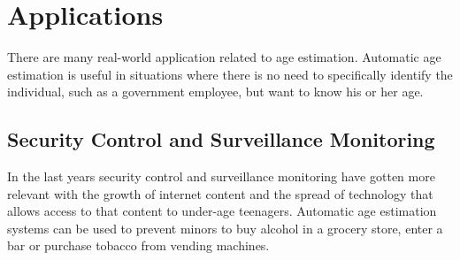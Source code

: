\begin{table}[h!]
	\centering
	\caption{Age Estimation Methods}
	\label{tab:age-methods}
\end{table}

\section{Applications}
There are many real-world application related to age estimation. Automatic age estimation is useful in situations where there is no need to specifically identify the individual, such as a government employee, but want to know his or her age.

\subsection{Security Control and Surveillance Monitoring}
In the last years security control and surveillance monitoring have gotten more relevant with the growth of internet content and the spread of technology that allows access to that content to under-age teenagers. Automatic age estimation systems can be used to prevent minors to buy alcohol in a grocery store, enter a bar or purchase tobacco from vending machines.

